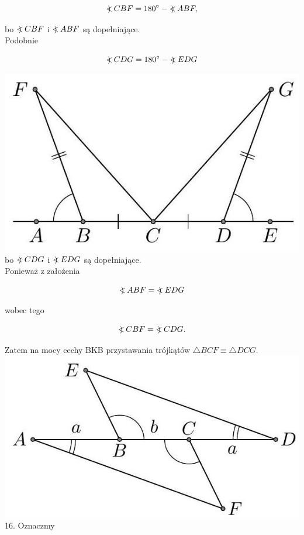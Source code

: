 \documentclass[10pt]{article}
\newcommand\Varangle{\mathop{{<\!\!\!\!\!\text{\small)}}\:}\nolimits}
\begin{document}
\[
\Varangle C B F=180^{\circ}-\Varangle A B F,
\]

bo \(\Varangle C B F\) i \(\Varangle A B F\) są dopełniające.\\
Podobnie

\[
\Varangle C D G=180^{\circ}-\Varangle E D G
\]

\includegraphics[max width=\textwidth, center]{2024_11_21_71f62bd117d375398909g-062(1)}\\
bo \(\Varangle C D G\) i \(\Varangle E D G\) są dopełniające.\\
Ponieważ z założenia

\[
\Varangle A B F=\Varangle E D G
\]

wobec tego

\[
\Varangle C B F=\Varangle C D G .
\]

Zatem na mocy cechy BKB przystawania trójkątów \(\triangle B C F \equiv \triangle D C G\).\\
\includegraphics[max width=\textwidth, center]{2024_11_21_71f62bd117d375398909g-063(1)}\\
16. Oznaczmy
\end{document}
